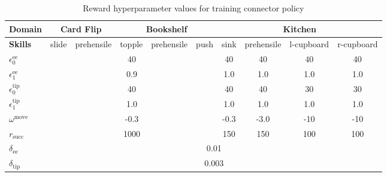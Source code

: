 \begin{table}[H]
\centering
\begin{tabular}{|l|c|c|c|c|c|c|c|c|c|}
\hline
\textbf{Domain} & \multicolumn{2}{c|}{\textbf{Card Flip}} & \multicolumn{3}{c|}{\textbf{Bookshelf}} & \multicolumn{4}{c|}{\textbf{Kitchen}} \\ \hline
\textbf{Skills} & slide & prehensile & topple & prehensile & push & sink & prehensile & l-cupboard & r-cupboard \\ \hline
$\epsilon^\text{ee}_0$       &  \multicolumn{5}{c|}{40} & 40  & 40 & 40 & 40 \\ \hline
$\epsilon^\text{ee}_1$       &  \multicolumn{5}{c|}{0.9}  & 1.0 & 1.0 & 1.0 & 1.0 \\ \hline
$\epsilon^\text{tip}_0$       &  \multicolumn{5}{c|}{40} & 40 & 40 & 30 & 30\\ \hline
$\epsilon^\text{tip}_1$       & \multicolumn{5}{c|}{1.0}  & 1.0 & 1.0 & 1.0 & 1.0\\ \hline
$\omega^{\text{move}}$ &  \multicolumn{5}{c|}{-0.3}  & -0.3 & -3.0 & -10 & -10\\ \hline
$r_\text{succ}$ &   \multicolumn{5}{c|}{1000}  & 150 & 150 & 100 & 100\\ \hline
$\delta_{\text{ee}}$ & \multicolumn{9}{c|}{0.01}  \\ \hline
$\delta_{\text{tip}}$ & \multicolumn{9}{c|}{0.003}  \\ \hline
\end{tabular}
\caption{Reward hyperparameter values for training connector policy}\label{table:connector_reward}
\end{table}
